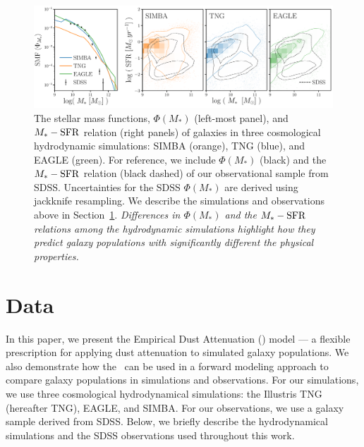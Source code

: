 \begin{figure}
\begin{center}
    \includegraphics[width=\textwidth]{figs/smf_m_sfr.pdf}
    \caption{\label{fig:smf_msfr}
    The stellar mass functions, $\Phi(M_*)$ (left-most panel), and $M_*-{\rm SFR}$
    relation (right panels) of galaxies in three cosmological hydrodynamic 
    simulations: SIMBA (orange), TNG (blue), and EAGLE (green). 
    For reference, we include $\Phi(M_*)$ (black) and the $M_*-{\rm SFR}$ relation 
    (black dashed) of our observational sample from SDSS. Uncertainties for the 
    SDSS $\Phi(M_*)$ are derived using jackknife resampling. We describe the
    simulations and observations above in Section~\ref{sec:sims}. \emph{Differences
    in $\Phi(M_*)$ and the $M_*-{\rm SFR}$ relations among the hydrodynamic simulations 
    highlight how they predict galaxy populations with significantly different
    the physical properties.} 
    }
\end{center}
\end{figure}

\section{Data}\label{sec:sims}
In this paper, we present the Empirical Dust Attenuation (\eda) model --- a
flexible prescription for applying dust attenuation to simulated galaxy
populations. We also demonstrate how the \eda~can be used in a forward modeling
approach to compare galaxy populations in simulations and observations. For our
simulations, we use three cosmological hydrodynamical simulations: the
Illustris TNG (hereafter TNG), EAGLE, and SIMBA. For our observations, we use a galaxy sample
derived from SDSS. Below, we briefly describe the hydrodynamical simulations and 
the SDSS observations used throughout this work.

